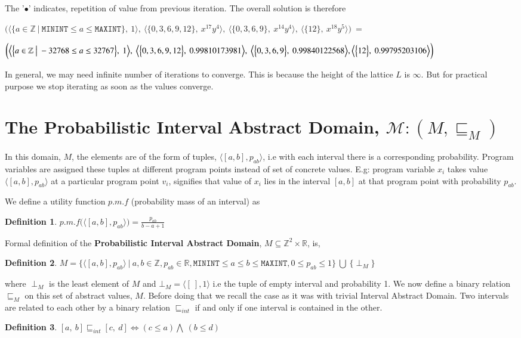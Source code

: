 \documentclass[final,3p, review, times]{Elsevier/elsarticle}
\newtheorem{definition}{Definition}[section]
\begin{document}
The '$\bullet$' indicates, repetition of value from previous iteration. The overall solution is therefore

\noindent$\bigg(\Big\langle\Big\{a\in\mathbb{Z}\ \big|\ \mathtt{MININT}\leq a\leq\mathtt{MAXINT}\Big\},\ 1\Big\rangle,\ \Big\langle\Big\{0,3,6,9,12\Big\},\ x^{17}y^4\Big\rangle,\ \Big\langle\Big\{0,3,6,9\Big\},\ x^{14}y^4\Big\rangle,\ \Big\langle\Big\{12\Big\},\ x^{18}y^5\Big\rangle\bigg)\ =$

\noindent$\bigg(\Big\langle\Big\{a\in\mathbb{Z}\ \big|\ -32768\leq a\leq 32767\Big\},\ 1\Big\rangle,\ \Big\langle\Big\{0,3,6,9,12\Big\},\ 0.99810173981\Big\rangle,\ \Big\langle\Big\{0,3,6,9\Big\},\ 0.99840122568\Big\rangle,\\
\Big\langle\Big\{12\Big\},\ 0.99795203106\Big\rangle\bigg)$

In general, we may need infinite number of iterations to converge. This is because the height of the lattice $L$ is $\infty$. But for practical purpose we stop iterating as soon as the values converge.


\section{The Probabilistic Interval Abstract Domain, $\mathcal{M}:(M,\sqsubseteq_M)$}

In this domain, $M$, the elements are of the form of tuples, $\langle[a,b],p_{ab}\rangle$, i.e with each interval there is a corresponding probability. Program variables are assigned these tuples at different program points instead of set of concrete values. E.g: program variable $x_i$ takes value $\langle[a,b],p_{ab}\rangle$ at a particular program point $v_i$, signifies that value of $x_i$ lies in the interval $[a,b]$ at that program point with probability $p_{ab}$.

We define a utility function $\mathit{p.m.f}$ (probability mass of an interval) as
\begin{definition}\label{pmf}
$p.m.f\Big(\langle[a,b],p_{ab}\rangle\Big)=\frac{p_{ab}}{b-a+1}$
\end{definition}

Formal definition of the \textbf{Probabilistic Interval Abstract Domain}, $M\subseteq \mathbb{Z}^2\times\mathbb{R}$, is,
\begin{definition}
  $M=\big\{\langle[a,b],p_{ab}\rangle\ |\ a,b\in\mathbb{Z}, p_{ab}\in\mathbb{R}, \mathtt{MININT}\leq a\leq b\leq\mathtt{MAXINT}, 0\leq p_{ab}\leq1\big\}\ \bigcup\ \big\{\perp_M\big\}$
\end{definition}
where $\perp_M$ is the least element of $M$ and $\bot_M=\langle[\ ],1\rangle$ i.e the tuple of empty interval and probability 1. We now define a binary relation $\sqsubseteq_M$ on this set of abstract values, $M$. Before doing that we recall the case as it was with trivial Interval Abstract Domain\cite{nielson99}. Two intervals are related to each other by a binary relation $\sqsubseteq_{int}$ if and only if one interval is contained in the other.
\begin{definition}\label{interval_def}
$[a,\ b]\sqsubseteq_{int}[c,\ d]\iff (c\leq a)\bigwedge\ (b\leq d)$
\end{definition}
\end{document}
